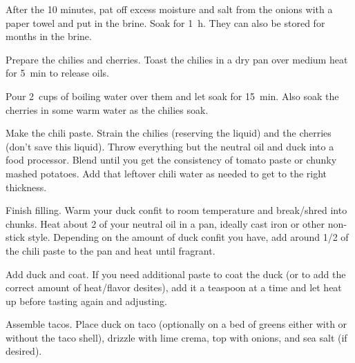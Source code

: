 \begin{recipe}
{		\step After the 10 minutes, pat off excess moisture and salt from the onions with a paper towel and put in the brine. Soak for \SI{1}{\hour}. They can also be stored for months in the brine.

		\step Prepare the chilies and cherries. Toast the chilies in a dry pan over medium heat for \SI{5}{\minute} to release oils.

		\step Pour \SI{2}{cups} of boiling water over them and let soak for \SI{15}{\minute}. Also soak the cherries in some warm water as the chilies soak.

		\step Make the chili paste. Strain the chilies (reserving the liquid) and the cherries (don't save this liquid). Throw everything but the neutral oil and duck into a food processor. Blend until you get the consistency of tomato paste or chunky mashed potatoes. Add that leftover chili water as needed to get to the right thickness.

		\step Finish filling. Warm your duck confit to room temperature and break/shred into chunks. Heat about \SI{2}{\tablespoon} of your neutral oil in a pan, ideally cast iron or other non-stick style. Depending on the amount of duck confit you have, add around \SI{1/2}{\cup} of the chili paste to the pan and heat until fragrant.

		\vspace{1em}

		\step Add duck and coat. If you need additional paste to coat the duck (or to add the correct amount of heat/flavor desites), add it a teaspoon at a time and let heat up before tasting again and adjusting.

		\step Assemble tacos. Place duck on taco (optionally on a bed of greens either with or without the taco shell), drizzle with lime crema, top with onions, and sea salt (if desired).
	}

\end{recipe}